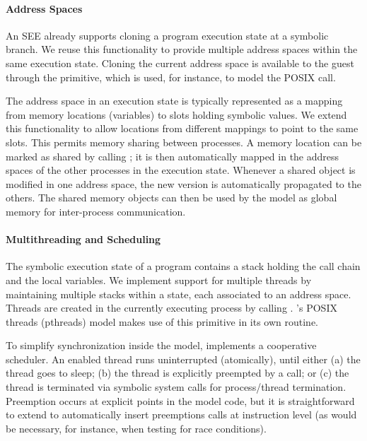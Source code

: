 \paragraph{Address Spaces}

An SEE already supports cloning a program execution state at a symbolic branch.
%
We reuse this functionality to provide multiple address spaces within the same execution state.  Cloning the current address space is available to the guest through the  primitive, which is used, for instance, to model the POSIX  call.

The address space in an execution state is typically represented as a mapping from memory locations (variables) to slots holding symbolic values.
%
We extend this functionality to allow locations from different mappings to point to the same slots.  This permits memory sharing between processes.
%
A memory location can be marked as shared by calling ; it is then automatically mapped in the address spaces of the other processes in the execution state.  Whenever a shared object is modified in one address space, the new version is automatically propagated to the others.  The shared memory objects can then be used by the model as global memory for inter-process communication.

\paragraph{Multithreading and Scheduling}

The symbolic execution state of a program contains a stack holding the call chain and the local variables.
%
We implement support for multiple threads by maintaining multiple stacks within a state, each associated to an address space.
%
Threads are created in the currently executing process by calling .  \cnine's POSIX threads (pthreads) model makes use of this primitive in its own  routine.

To simplify synchronization inside the model, \cnine implements a cooperative scheduler.
%
An enabled thread runs uninterrupted (atomically), until either (a) the thread goes to sleep; (b) the thread is explicitly preempted by a  call; or (c) the thread is terminated via symbolic system calls for process/thread termination. Preemption occurs at explicit points in the model code, but it is straightforward to extend \cnine to automatically insert preemptions calls at instruction level (as would be necessary, for instance, when testing for race conditions).

